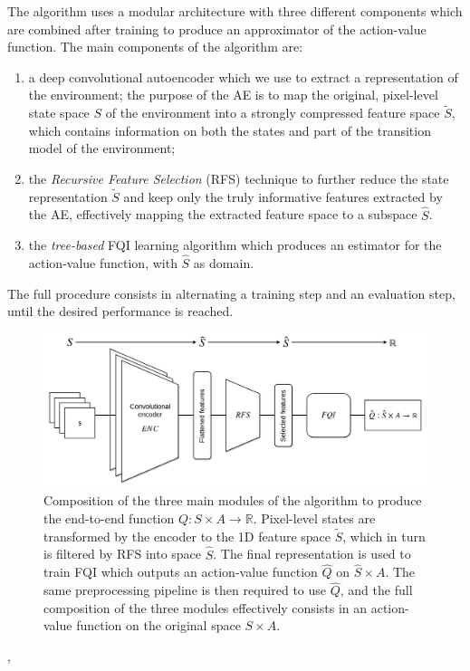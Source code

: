 The algorithm uses a modular architecture with three different components which 
are combined after training to produce an approximator of the action-value 
function. The main components of the algorithm are:
%
\begin{enumerate}
    \item a deep convolutional autoencoder which we use to extract a 
    representation of the environment;
    the purpose of the AE is to map the original, pixel-level state space $S$ of
    the environment into a strongly compressed feature space ${\tilde{S}}$, 
    which contains information on both the states and part of the transition 
    model of the environment;
    \item the \textit{Recursive Feature Selection} (RFS) technique to further 
    reduce the state representation $\tilde{S}$ and keep only the truly 
    informative features extracted by the AE, effectively mapping the extracted 
    feature space to a subspace $\hat{S}$.
    \item the \textit{tree-based} FQI learning algorithm which produces an 
    estimator for the action-value function, with $\hat{S}$ as domain. 
\end{enumerate}
%
The full procedure consists in alternating a training step and an evaluation 
step, until the desired performance is reached.
%
\begin{figure}
\includegraphics[width=\textwidth]{pictures/full_pipeline}
\centering
\caption[Schematic view of the three main modules]{Composition of the three main
						   modules of the algorithm to
						   produce the end-to-end 
						   function 
						   $Q: S \times A \rightarrow \mathbb{R}$.
						   Pixel-level states are transformed by the
						   encoder to the 1D feature space $\tilde{S}$,
						   which in turn is filtered by RFS into space 
						   $\hat{S}$. The final representation is 
						   used to train FQI which outputs an 
						   action-value function $\hat{Q}$ on 
						   $\hat{S} \times A$. 
						   The same preprocessing pipeline is then
						   required to use $\hat{Q}$, and the full 
						   composition of the three modules effectively
						   consists in an action-value function on 
						   the original space $S \times A$.}
\label{f:full_pipeline}
\end{figure},
%

